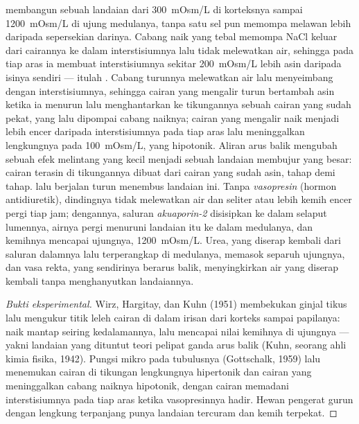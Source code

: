 \begin{proposition}\label{prop:b3:renal-osmoregulation:countercurrent}
%
 membangun sebuah landaian  dari \qty{300}{mOsm/L}
di korteksnya sampai \qty{1200}{mOsm/L} di ujung medulanya, tanpa
satu sel pun memompa melawan lebih daripada sepersekian darinya. Cabang
naik yang tebal memompa NaCl keluar dari cairannya ke dalam interstisiumnya lalu
tidak melewatkan air, sehingga pada tiap aras ia membuat interstisiumnya
sekitar \qty{200}{mOsm/L} lebih asin daripada isinya sendiri --- itulah
\emph{}. Cabang turunnya melewatkan air lalu
menyeimbang dengan interstisiumnya, sehingga cairan yang mengalir turun bertambah
asin ketika ia menurun lalu menghantarkan ke tikungannya sebuah cairan yang sudah
pekat, yang lalu dipompai cabang naiknya; cairan
yang mengalir naik menjadi lebih encer daripada interstisiumnya pada tiap aras lalu
meninggalkan lengkungnya pada \qty{100}{mOsm/L}, yang hipotonik. Aliran arus balik
mengubah sebuah efek melintang yang kecil menjadi sebuah landaian membujur yang besar:
cairan terasin di tikungannya dibuat dari cairan yang sudah
asin, tahap demi tahap.  lalu berjalan turun menembus
landaian ini. Tanpa \emph{vasopresin} (hormon antidiuretik),
dindingnya tidak melewatkan air dan seliter atau lebih kemih encer
pergi tiap jam; dengannya, saluran \emph{akuaporin-2} disisipkan ke dalam
selaput lumennya, airnya pergi menuruni landaian itu ke dalam
medulanya, dan kemihnya mencapai  ujungnya,
\qty{1200}{mOsm/L}. Urea, yang diserap kembali dari saluran dalamnya lalu terperangkap di
medulanya, memasok separuh  ujungnya, dan vasa rekta,
yang sendirinya berarus balik, menyingkirkan air yang diserap kembali tanpa
menghanyutkan landaiannya.
\end{proposition}

\begin{proof}[Bukti eksperimental]
Wirz, Hargitay, dan Kuhn (1951) membekukan ginjal tikus lalu mengukur
titik leleh cairan di dalam irisan dari korteks sampai papilanya:
 naik mantap seiring kedalamannya, lalu mencapai nilai kemihnya di
ujungnya --- yakni landaian yang dituntut teori pelipat ganda arus balik (Kuhn,
seorang ahli kimia fisika, 1942). Pungsi mikro pada tubulusnya
(Gottschalk, 1959) lalu menemukan cairan di tikungan lengkungnya
hipertonik dan cairan yang meninggalkan cabang naiknya hipotonik, dengan
cairan  memadani interstisiumnya pada tiap aras ketika
vasopresinnya hadir. Hewan pengerat gurun dengan lengkung terpanjang punya
landaian tercuram dan kemih terpekat.
\end{proof}

